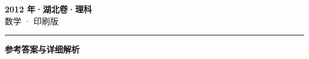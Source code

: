 \documentclass[zihao=5, a4paper]{ctexart}
\begin{document}
\begin{center}
  {\Large\bfseries 2012 年·湖北卷·理科}\\[4pt]
  {\large 数学 · 印刷版}
\end{center}
\medskip
{}

\par\bigskip\hrule\bigskip
{}
\Needspace{0.55\textheight}
\begin{center}{\large\bfseries 参考答案与详细解析}\end{center}
\smallskip

\end{document}
